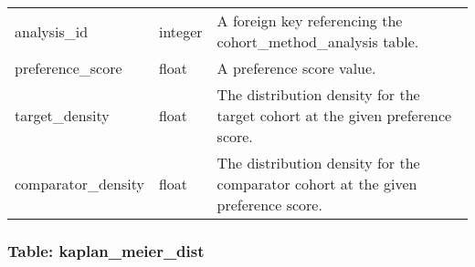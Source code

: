 \documentclass[
]{article}
\begin{document}
\begin{longtable}[]{@{}lll@{}}
\begin{minipage}[t]{0.23\columnwidth}\raggedright
analysis\_id\strut
\end{minipage} & \begin{minipage}[t]{0.18\columnwidth}\raggedright
integer\strut
\end{minipage} & \begin{minipage}[t]{0.50\columnwidth}\raggedright
A foreign key referencing the cohort\_method\_analysis table.\strut
\end{minipage}\tabularnewline
\begin{minipage}[t]{0.23\columnwidth}\raggedright
preference\_score\strut
\end{minipage} & \begin{minipage}[t]{0.18\columnwidth}\raggedright
float\strut
\end{minipage} & \begin{minipage}[t]{0.50\columnwidth}\raggedright
A preference score value.\strut
\end{minipage}\tabularnewline
\begin{minipage}[t]{0.23\columnwidth}\raggedright
target\_density\strut
\end{minipage} & \begin{minipage}[t]{0.18\columnwidth}\raggedright
float\strut
\end{minipage} & \begin{minipage}[t]{0.50\columnwidth}\raggedright
The distribution density for the target cohort at the given preference
score.\strut
\end{minipage}\tabularnewline
\begin{minipage}[t]{0.23\columnwidth}\raggedright
comparator\_density\strut
\end{minipage} & \begin{minipage}[t]{0.18\columnwidth}\raggedright
float\strut
\end{minipage} & \begin{minipage}[t]{0.50\columnwidth}\raggedright
The distribution density for the comparator cohort at the given
preference score.\strut
\end{minipage}\tabularnewline
\bottomrule
\end{longtable}

\hypertarget{table-kaplan_meier_dist}{%
\subsubsection{Table:
kaplan\_meier\_dist}\label{table-kaplan_meier_dist}}
\end{document}
